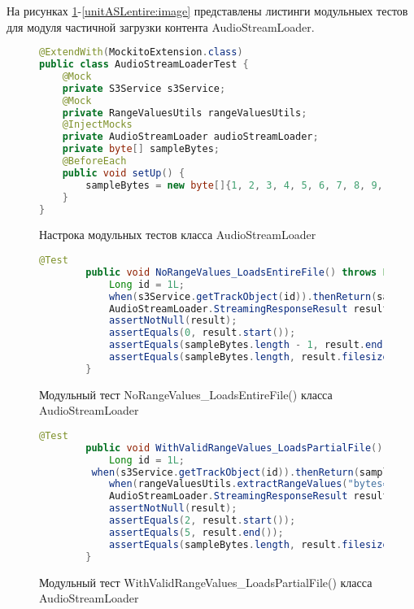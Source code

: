 На рисунках \ref{unitASL:image}-\ref{unitASLentire:image} представлены листинги модульныех тестов для модуля частичной загрузки контента AudioStreamLoader.
\begin{figure}[ht]
\begin{lstlisting}[language=Java]
@ExtendWith(MockitoExtension.class)
public class AudioStreamLoaderTest {
	@Mock
	private S3Service s3Service;
	@Mock
	private RangeValuesUtils rangeValuesUtils;
	@InjectMocks
	private AudioStreamLoader audioStreamLoader;
	private byte[] sampleBytes;
	@BeforeEach
	public void setUp() {
		sampleBytes = new byte[]{1, 2, 3, 4, 5, 6, 7, 8, 9, 10};
	}
}
\end{lstlisting}  
\caption{Настрока модульных тестов класса AudioStreamLoader}
\label{unitASL:image}
\end{figure}
\begin{figure}[!ht]
	\begin{lstlisting}[language=Java]
		@Test
		public void NoRangeValues_LoadsEntireFile() throws Exception {
			Long id = 1L;
			when(s3Service.getTrackObject(id)).thenReturn(sampleBytes);
			AudioStreamLoader.StreamingResponseResult result = audioStreamLoader.loadPartialMediaFromStorage(id, null);
			assertNotNull(result);
			assertEquals(0, result.start());
			assertEquals(sampleBytes.length - 1, result.end());
			assertEquals(sampleBytes.length, result.filesize());
		}
	\end{lstlisting}  
	\caption{Модульный тест NoRangeValues\_LoadsEntireFile() класса AudioStreamLoader}
	\label{unitASLnorangeentire:image}
\end{figure}
\begin{figure}[!ht]
	\begin{lstlisting}[language=Java]
			@Test
		public void WithValidRangeValues_LoadsPartialFile() throws Exception {
			Long id = 1L;
		 when(s3Service.getTrackObject(id)).thenReturn(sampleBytes);
			when(rangeValuesUtils.extractRangeValues("bytes=2-5")).thenReturn(new long[]{2, 5});
			AudioStreamLoader.StreamingResponseResult result = audioStreamLoader.loadPartialMediaFromStorage(id, "bytes=2-5");
			assertNotNull(result);
			assertEquals(2, result.start());
			assertEquals(5, result.end());
			assertEquals(sampleBytes.length, result.filesize());
		}
	\end{lstlisting}  
	\caption{Модульный тест WithValidRangeValues\_LoadsPartialFile() класса AudioStreamLoader}
	\label{unitASLvalid:image}
\end{figure}
